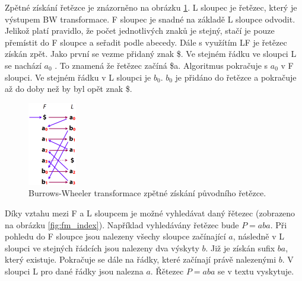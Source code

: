 \documentclass[czech,DP]{thesiskiv}
\numberwithin{equation}{section}
\begin{document}
\noindent
Zpětné získání řetězce je znázorněno na obrázku \ref{fig:bw_transform_inverse}. L sloupec je řetězec, který je výstupem BW transformace. F sloupec je snadné na základě L sloupce odvodit. Jelikož platí pravidlo, že počet jednotlivých znaků je stejný, stačí je pouze přemístit do F sloupce a seřadit podle abecedy. Dále s využítím LF je řetězec získán zpět. Jako první se vezme přidaný znak \$. Ve stejném řádku ve sloupci L se nachází $a_0$ . To znamená že řetězec začíná \$a. Algoritmus pokračuje s $a_0$ v F sloupci. Ve stejném řádku v L sloupci je $b_0$. $b_0$ je přidáno do řetězce a pokračuje až do doby než by byl opět znak \$. 


\begin{figure}[H]		
		\centering
		\includegraphics[width=80px]{./img/BWT_3.png}
		\caption{Burrows-Wheeler transformace zpětné získání původního řetězce. \cite{bw_transform}}
		\label{fig:bw_transform_inverse}
\end{figure}

\noindent
Díky vztahu mezi F a L sloupcem je možné vyhledávat daný řětezec (zobrazeno na obrázku \ref{fig:fm_index}). Například vyhledávány řetězec bude $P = aba$. Při pohledu do F sloupce jsou nalezeny všechy sloupce začínající $a$, následně v L sloupci ve stejných řádcích jsou nalezeny dva výskyty $b$. Již je získán sufix $ba$, který existuje. Pokračuje se dále na řádky, které začínají právě nalezenými $b$. V sloupci L pro dané řádky jsou nalezna $a$. Řětezec $P = aba$ se v textu vyskytuje. 
\end{document}
